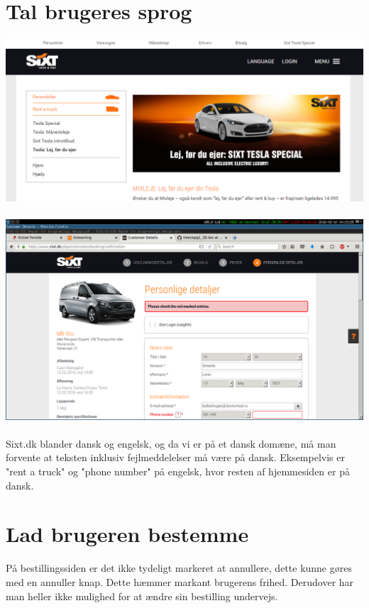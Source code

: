 \documentclass[12pt]{article}
\begin{document}
\section{Tal brugeres sprog}
\includegraphics[scale=0.5]{img/Blande_Engelsk_Dansk}
\\
\\
\includegraphics[scale=0.3]{img/CheckRedMarks}
\\
\\
Sixt.dk blander dansk og engelsk, og da vi er på et dansk domæne, må man forvente at teksten inklusiv fejlmeddelelser må være på dansk. Eksempelvis er "rent a truck" og "phone number" på engelsk, hvor resten af hjemmesiden er på dansk.

\newpage

\section{Lad brugeren bestemme}

På bestillingssiden er det ikke tydeligt markeret at annullere, dette kunne gøres med en annuller knap. Dette hæmmer markant brugerens frihed. Derudover har man heller ikke mulighed for at ændre sin bestilling undervejs. 
\end{document}
